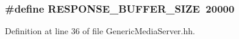 \subsubsection[{R\+E\+S\+P\+O\+N\+S\+E\+\_\+\+B\+U\+F\+F\+E\+R\+\_\+\+S\+I\+Z\+E}]{\setlength{\rightskip}{0pt plus 5cm}\#define R\+E\+S\+P\+O\+N\+S\+E\+\_\+\+B\+U\+F\+F\+E\+R\+\_\+\+S\+I\+Z\+E~20000}\label{GenericMediaServer_8hh_a3d9d93e9a53461ba2177521472b761c4}


Definition at line 36 of file Generic\+Media\+Server.\+hh.

